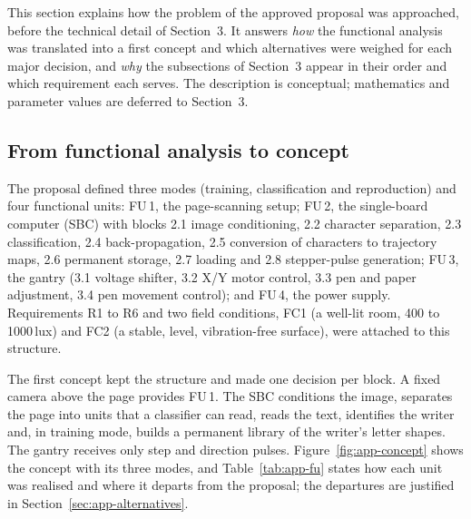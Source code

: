 \label{sec:approach}
This section explains how the problem of the approved proposal was approached, before the technical detail of Section~3. It answers \emph{how} the functional analysis was translated into a first concept and which alternatives were weighed for each major decision, and \emph{why} the subsections of Section~3 appear in their order and which requirement each serves. The description is conceptual; mathematics and parameter values are deferred to Section~3.

\subsection{From functional analysis to concept}
\label{sec:app-concept}

The proposal defined three modes (training, classification and reproduction) and four functional units: FU\,1, the page-scanning setup; FU\,2, the single-board computer (SBC) with blocks 2.1 image conditioning, 2.2 character separation, 2.3 classification, 2.4 back-propagation, 2.5 conversion of characters to trajectory maps, 2.6 permanent storage, 2.7 loading and 2.8 stepper-pulse generation; FU\,3, the gantry (3.1 voltage shifter, 3.2 X/Y motor control, 3.3 pen and paper adjustment, 3.4 pen movement control); and FU\,4, the power supply. Requirements R1 to R6 and two field conditions, FC1 (a well-lit room, 400 to 1000\,lux) and FC2 (a stable, level, vibration-free surface), were attached to this structure.

The first concept kept the structure and made one decision per block. A fixed camera above the page provides FU\,1. The SBC conditions the image, separates the page into units that a classifier can read, reads the text, identifies the writer and, in training mode, builds a permanent library of the writer's letter shapes. The gantry receives only step and direction pulses. Figure~\ref{fig:app-concept} shows the concept with its three modes, and Table~\ref{tab:app-fu} states how each unit was realised and where it departs from the proposal; the departures are justified in Section~\ref{sec:app-alternatives}.

